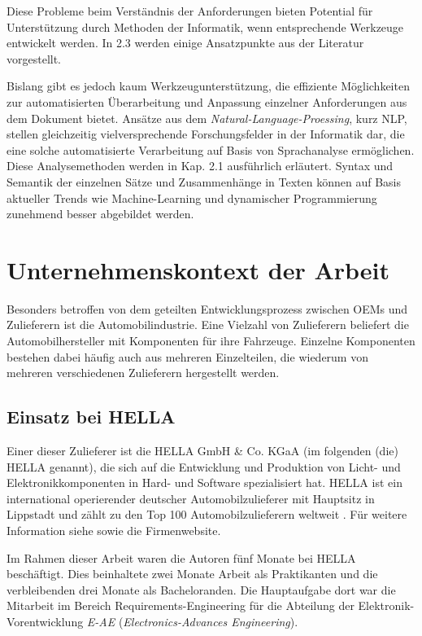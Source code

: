 \documentclass[12pt]{report}
\begin{document}
Diese Probleme beim Verständnis der Anforderungen bieten Potential für Unterstützung durch Methoden der Informatik, wenn entsprechende Werkzeuge entwickelt werden. In 2.3 werden einige Ansatzpunkte aus der Literatur vorgestellt.

Bislang gibt es jedoch kaum Werkzeugunterstützung, die effiziente Möglichkeiten zur automatisierten Überarbeitung und Anpassung einzelner Anforderungen aus dem Dokument bietet. Ansätze aus dem \textit{Natural-Language-Proessing}, kurz NLP, stellen gleichzeitig vielversprechende Forschungsfelder in der Informatik dar, die eine solche automatisierte Verarbeitung auf Basis von Sprachanalyse ermöglichen. Diese Analysemethoden werden in Kap. 2.1 ausführlich erläutert. Syntax und Semantik der einzelnen Sätze und Zusammenhänge in Texten können auf Basis aktueller Trends wie Machine-Learning und dynamischer Programmierung zunehmend besser abgebildet werden.

\section[Unternehmenskontext]{Unternehmenskontext der Arbeit}
Besonders betroffen von dem geteilten Entwicklungsprozess zwischen OEMs und Zulieferern ist die Automobilindustrie. Eine Vielzahl von Zulieferern beliefert die Automobilhersteller mit Komponenten für ihre Fahrzeuge. Einzelne Komponenten bestehen dabei häufig auch aus mehreren Einzelteilen, die wiederum von mehreren verschiedenen Zulieferern hergestellt werden. \cite{awk06}

\subsection{Einsatz bei HELLA}
Einer dieser Zulieferer ist die HELLA GmbH \& Co. KGaA (im folgenden (die) HELLA genannt), die sich auf die Entwicklung und Produktion von Licht- und Elektronikkomponenten in Hard- und Software spezialisiert hat. HELLA ist ein international operierender deutscher Automobilzulieferer mit Hauptsitz in Lippstadt und zählt zu den Top 100 Automobilzulieferern weltweit \cite{lv10}. Für weitere Information siehe \cite{he19} sowie die Firmenwebsite. 

Im Rahmen dieser Arbeit waren die Autoren fünf Monate bei HELLA beschäftigt. Dies beinhaltete zwei Monate Arbeit als Praktikanten und die verbleibenden drei Monate als Bacheloranden. 
Die Hauptaufgabe dort war die Mitarbeit im Bereich Requirements-Engineering für die Abteilung der Elektronik-Vorentwicklung \textit{E-AE} (\textit{Electronics-Advances Engineering}). 
\end{document}
